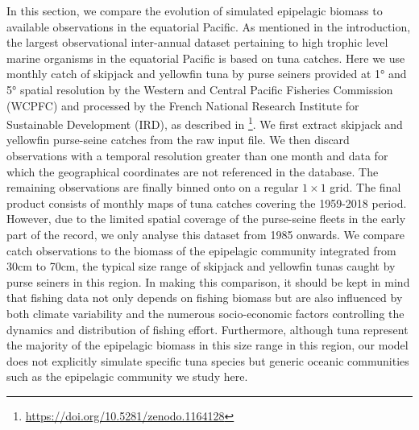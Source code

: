 In this section, we compare the evolution of simulated epipelagic biomass to available observations in the equatorial Pacific. As mentioned in the introduction, the largest observational inter-annual dataset pertaining to high trophic level marine organisms in the equatorial Pacific is based on tuna catches. Here we use monthly catch of skipjack and yellowfin tuna by purse seiners provided at 1° and 5° spatial resolution by the Western and Central Pacific Fisheries Commission (WCPFC) and processed by the French National Research Institute for Sustainable Development (IRD), as described in  \cite{taconetGlobalMonthlyCatch2018}\footnote{\url{https://doi.org/10.5281/zenodo.1164128}}. We first extract skipjack and yellowfin purse-seine catches from the raw input file. We then discard observations with a temporal resolution greater than one month and data for which the geographical coordinates are not referenced in the database. The remaining observations are finally binned onto on a regular $1 \times 1$ grid. The final product consists of monthly maps of tuna catches covering the 1959-2018 period. However, due to the limited spatial coverage of the purse-seine fleets in the early part of the record, we only analyse this dataset from 1985 onwards. We compare catch observations to the biomass of the epipelagic community integrated from 30cm to 70cm, the typical size range of  skipjack and yellowfin tunas caught by purse seiners in this region. In making this comparison, it should be kept in mind that fishing data not only depends on fishing biomass but are also influenced by both climate variability and the numerous socio-economic factors controlling the dynamics and distribution of fishing effort. Furthermore, although tuna represent the majority of the epipelagic biomass in this size range in this region, our model does not explicitly simulate specific tuna species but generic oceanic communities such as the epipelagic community we study here.

